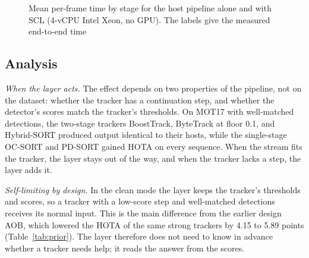 \documentclass[pdflatex,referee,sn-mathphys-num]{sn-jnl}
\newcommand{\scl}{SCL}
\newcommand{\aob}{AOB}
\begin{document}
\begin{figure}[t]
\centering
\caption{Mean per-frame time by stage for the host pipeline alone and with
\scl{} (4-vCPU Intel Xeon, no GPU). The labels give the measured
end-to-end time}
\label{fig:runtime}
\end{figure}
\subsection{Analysis}\label{sec:discussion}

\emph{When the layer acts.} The effect depends on two properties of the
pipeline, not on the dataset: whether the tracker has a continuation step,
and whether the detector's scores match the tracker's thresholds. On MOT17
with well-matched detections, the two-stage trackers BoostTrack, ByteTrack at
floor 0.1, and Hybrid-SORT produced output identical to their hosts, while
the single-stage OC-SORT and PD-SORT gained HOTA on every sequence. When the
stream fits the tracker, the layer stays out of the way, and when the
tracker lacks a step, the layer adds it.

\emph{Self-limiting by design.} In the clean mode the layer keeps the
tracker's thresholds and scores, so a tracker with a low-score step and
well-matched detections receives its normal input. This is the main
difference from the earlier design \aob{}, which lowered the HOTA of the same
strong trackers by 4.15 to 5.89 points (Table~\ref{tab:prior}). The layer
therefore does not need to know in advance whether a tracker needs help; it
reads the answer from the scores.
\end{document}
